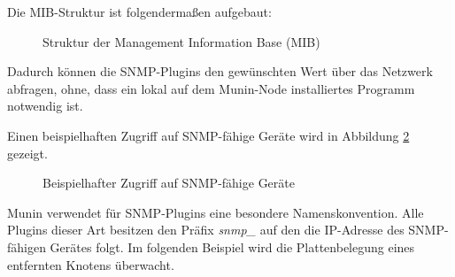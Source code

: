 Die MIB-Struktur ist folgendermaßen aufgebaut:

\begin{figure}[ht]
	\centering
		\caption{Struktur der Management Information Base (MIB)}
		\label{munin-mib}
\end{figure}

Dadurch können die SNMP-Plugins den gewünschten Wert über das Netzwerk abfragen, ohne, dass ein lokal auf dem Munin-Node installiertes Programm notwendig ist.

\newpage

Einen beispielhaften Zugriff auf SNMP-fähige Geräte wird in Abbildung \ref{munin-snmp} gezeigt.

\begin{figure}[ht]
	\centering
		\caption{Beispielhafter Zugriff auf SNMP-fähige Geräte}
		\label{munin-snmp}
\end{figure}

Munin verwendet für SNMP-Plugins eine besondere Namenskonvention.
Alle Plugins dieser Art besitzen den Präfix \textit{snmp\_} auf den die IP-Adresse des SNMP-fähigen Gerätes folgt.
Im folgenden Beispiel wird die Plattenbelegung eines entfernten Knotens überwacht.

